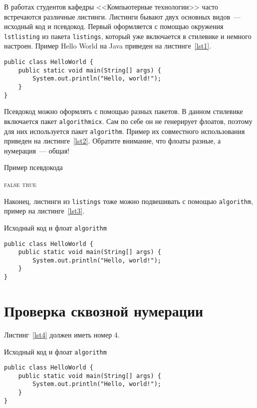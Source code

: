 \documentclass[annotation,times,page4]{itmo-student-thesis}
\begin{document}
В работах студентов кафедры <<Компьютерные технологии>> часто встречаются различные листинги. Листинги бывают
двух основных видов~--- исходный код и псевдокод. Первый оформляется с помощью окружения \texttt{lstlisting}
из пакета \texttt{listings}, который уже включается в стилевике и немного настроен. Пример Hello World на Java
приведен на листинге~\ref{lst1}.

\begin{lstlisting}[float=!h,caption={Пример исходного кода на Java},label={lst1}]
public class HelloWorld {
	public static void main(String[] args) {
		System.out.println("Hello, world!");
	}
}
\end{lstlisting}

Псевдокод можно оформлять с помощью разных пакетов. В данном стилевике включается пакет \texttt{algorithmicx}.
Сам по себе он не генерирует флоатов, поэтому для них используется пакет \texttt{algorithm}.
Пример их совместного использования приведен на листинге~\ref{lst2}. Обратите внимание, что флоаты разные, а 
нумерация~--- общая!

\begin{algorithm}[!h]
\caption{Пример псевдокода}\label{lst2}
\begin{algorithmic}
				\State\Return \textsc{false}
			\EndIf
		\EndFor
		\State\Return \textsc{true}
	\EndFunction
\end{algorithmic}
\end{algorithm}

Наконец, листинги из \texttt{listings} тоже можно подвешивать с помощью \texttt{algorithm},
пример на листинге~\ref{lst3}.

\begin{algorithm}[!h]
\caption{Исходный код и флоат \texttt{algorithm}}\label{lst3}
\begin{lstlisting}
public class HelloWorld {
	public static void main(String[] args) {
		System.out.println("Hello, world!");
	}
}
\end{lstlisting}
\end{algorithm}

\chapter{Проверка сквозной нумерации}

Листинг~\ref{lst4} должен иметь номер 4.

\begin{algorithm}[!h]
\caption{Исходный код и флоат \texttt{algorithm}}\label{lst4}
\begin{lstlisting}
public class HelloWorld {
	public static void main(String[] args) {
		System.out.println("Hello, world!");
	}
}
\end{lstlisting}
\end{algorithm}
\end{document}
